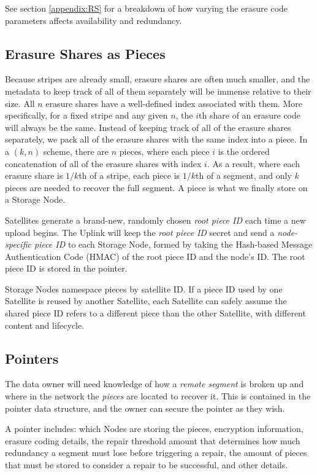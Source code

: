 \documentclass[8pt,fleqn,openany]{book}
\begin{document}
See section \ref{appendix:RS} for a breakdown of how varying the erasure code
parameters affects availability and redundancy.

\subsection{Erasure Shares as Pieces}

Because stripes are already small, erasure shares are often much
smaller, and the metadata to keep track of all of them separately will be
immense relative to their size.
All $n$ erasure shares have a well-defined index associated
with them. More specifically, for
a fixed stripe and any given $n$, the $i$th share of an erasure
code will always be the same.
Instead of keeping track of all of the
erasure shares separately, we pack all of the erasure shares with the
same index into a piece.
In a $(k, n)$ scheme, there are $n$ pieces, where each
piece $i$ is the ordered concatenation of all of the erasure shares with
index $i$. As a result, where each erasure share is $1/k$th of a
stripe, each piece is $1/k$th of a segment, and only $k$
pieces are needed to recover the full segment.
A piece is what
we finally store on a Storage Node.

Satellites generate a brand-new, randomly chosen {\em root piece ID} each time
a new upload begins. The Uplink will keep the {\em root piece ID} secret and send
a {\em node-specific piece ID} to each Storage Node, formed by taking the Hash-based
Message Authentication Code (HMAC) of the root piece ID and the node's ID.
The root piece ID is stored in the pointer.

Storage Nodes namespace pieces by satellite ID. If a piece ID used by one
Satellite is reused by another Satellite, each Satellite can safely assume the shared piece ID refers
to a different piece than the other Satellite, with different content and lifecycle.

\subsection{Pointers}

The data owner will need knowledge of how a {\em remote segment} is broken up and
where in the network the {\em pieces} are located to recover it. This is contained
in the pointer data structure, and the owner can secure the pointer as
they wish.

A pointer includes: which Nodes are storing the pieces,
encryption information, erasure coding details,
the repair threshold amount that determines how much redundancy a segment
must lose before triggering a repair, the amount of pieces that must be
stored to consider a repair to be successful, and other details.
\end{document}

